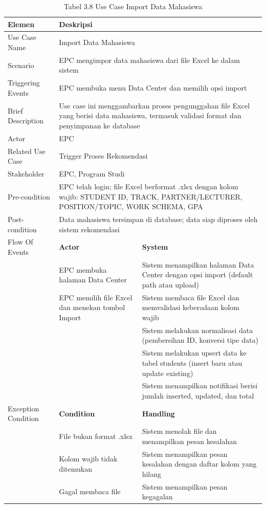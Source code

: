 \begin{longtable}{|p{3.5cm}|p{4.5cm}|p{5cm}|}
\caption{Tabel 3.8 Use Case Import Data Mahasiswa} \label{table:tab3.8} \\
\hline
\textbf{Elemen} & \multicolumn{2}{p{\ucdeskcol}|}{\textbf{Deskripsi}} \\
\hline
\endfirsthead
\endhead
\hline
\endfoot
Use Case Name & \multicolumn{2}{p{\ucdeskcol}|}{Import Data Mahasiswa} \\
\hline
Scenario & \multicolumn{2}{p{\ucdeskcol}|}{EPC mengimpor data mahasiswa dari file Excel ke dalam sistem} \\
\hline
Triggering Events & \multicolumn{2}{p{\ucdeskcol}|}{EPC membuka menu Data Center dan memilih opsi import} \\
\hline
Brief Description & \multicolumn{2}{p{\ucdeskcol}|}{Use case ini menggambarkan proses pengunggahan file Excel yang berisi data mahasiswa, termasuk validasi format dan penyimpanan ke database} \\
\hline
Actor & \multicolumn{2}{p{\ucdeskcol}|}{EPC} \\
\hline
Related Use Case & \multicolumn{2}{p{\ucdeskcol}|}{Trigger Proses Rekomendasi} \\
\hline
Stakeholder & \multicolumn{2}{p{\ucdeskcol}|}{EPC, Program Studi} \\
\hline
Pre-condition & \multicolumn{2}{p{\ucdeskcol}|}{EPC telah login; file Excel berformat .xlsx dengan kolom wajib: STUDENT ID, TRACK, PARTNER/LECTURER, POSITION/TOPIC, WORK SCHEMA, GPA} \\
\hline
Post-condition & \multicolumn{2}{p{\ucdeskcol}|}{Data mahasiswa tersimpan di database; data siap diproses oleh sistem rekomendasi} \\
\hline
Flow Of Events & \textbf{Actor} & \textbf{System} \\
\hline
 & EPC membuka halaman Data Center & Sistem menampilkan halaman Data Center dengan opsi import (default path atau upload) \\
\hline
 & EPC memilih file Excel dan menekan tombol Import & Sistem membaca file Excel dan memvalidasi keberadaan kolom wajib \\
\hline
 & & Sistem melakukan normalisasi data (pembersihan ID, konversi tipe data) \\
\hline
 & & Sistem melakukan upsert data ke tabel students (insert baru atau update existing) \\
\hline
 & & Sistem menampilkan notifikasi berisi jumlah inserted, updated, dan total \\
\hline
Exception Condition & \textbf{Condition} & \textbf{Handling} \\
\hline
 & File bukan format .xlsx & Sistem menolak file dan menampilkan pesan kesalahan \\
\hline
 & Kolom wajib tidak ditemukan & Sistem menampilkan pesan kesalahan dengan daftar kolom yang hilang \\
\hline
 & Gagal membaca file & Sistem menampilkan pesan kegagalan \\
\hline
\end{longtable}

